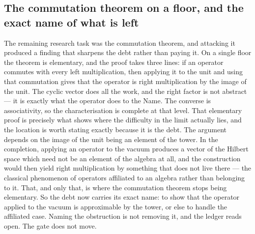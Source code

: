 \documentclass[11pt]{article}
\theoremstyle{definition}\newtheorem{deriv}{Derivation}
\begin{document}
\subsection*{The commutation theorem on a floor, and the exact name of what is left}The remaining research task was the commutation theorem, and attacking it produced a finding that sharpens the debt rather than paying it. On a single floor the theorem is elementary, and the proof takes three lines: if an operator commutes with every left multiplication, then applying it to the unit and using that commutation gives that the operator is right multiplication by the image of the unit. The cyclic vector does all the work, and the right factor is not abstract --- it is exactly what the operator does to the Name. The converse is associativity, so the characterisation is complete at that level. That elementary proof is precisely what shows where the difficulty in the limit actually lies, and the location is worth stating exactly because it is the debt. The argument depends on the image of the unit being an element of the tower. In the completion, applying an operator to the vacuum produces a vector of the Hilbert space which need not be an element of the algebra at all, and the construction would then yield right multiplication by something that does not live there --- the classical phenomenon of operators affiliated to an algebra rather than belonging to it. That, and only that, is where the commutation theorem stops being elementary. So the debt now carries its exact name: to show that the operator applied to the vacuum is approximable by the tower, or else to handle the affiliated case. Naming the obstruction is not removing it, and the ledger reads open. The gate does not move.
\end{document}
